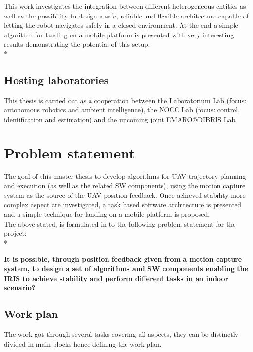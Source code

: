 This work investigates the integration between different heterogeneous entities as well as the possibility to design a safe, reliable and flexible architecture capable of letting the robot navigates safely in a closed environment. At the end a simple algorithm for landing on a mobile platform is presented with very interesting results demonstrating the potential of this setup.\\*

\subsection{Hosting laboratories}
This thesis is carried out as a cooperation between the Laboratorium Lab (focus:
autonomous robotics and ambient intelligence), the NOCC Lab (focus: control,
identification and estimation) and the upcoming joint EMARO@DIBRIS Lab.

\newpage

\section{Problem statement}

The goal of this master thesis to develop algorithms for UAV trajectory planning and execution (as well as the related SW components), using the motion capture system as the source of the UAV position feedback. Once achieved stability more complex aspect are investigated, a task based software architecture is presented and a simple technique for landing on a mobile platform is proposed.\\
The above stated, is formulated in to the following problem statement for the project: \\*

\noindent
\textbf{It is possible, through position feedback given from a motion capture system, to design a set of algorithms and SW components enabling the IRIS to achieve stability and perform different tasks in an indoor scenario? }

\subsection{Work plan}
The work got through several tasks covering all aspects, they can be distinctly divided in main blocks hence defining the work plan.

